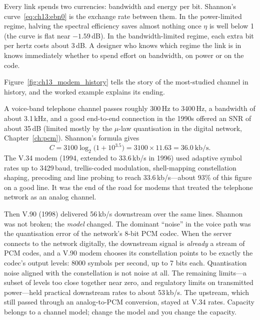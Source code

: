 \begin{keyidea}
Every link spends two currencies: bandwidth and energy per bit. Shannon's
curve~\eqref{eq:ch13:ebn0} is the exchange rate between them. In the power-limited regime, halving
the spectral efficiency saves almost nothing once $\eta$ is well below 1 (the curve is flat near
$-1.59$\,dB). In the bandwidth-limited regime, each extra bit per hertz costs about 3\,dB. A
designer who knows which regime the link is in knows immediately whether to spend effort on
bandwidth, on power or on the code.
\end{keyidea}


Figure~\ref{fig:ch13_modem_history} tells the story of the most-studied channel in history, and
the worked example explains its ending.

\begin{worked}
A voice-band telephone channel passes roughly 300\,Hz to 3400\,Hz, a bandwidth of about
3.1\,kHz, and a good end-to-end connection in the 1990s offered an SNR of about 35\,dB (limited
mostly by the $\mu$-law quantisation in the digital network, Chapter~\ref{ch:pcm}). Shannon's
formula gives
\[
C=3100\log_2\big(1+10^{3.5}\big)=3100\times11.63=36.0\ \text{kb/s}.
\]
The V.34 modem (1994, extended to 33.6\,kb/s in 1996) used adaptive symbol rates up to 3429\,baud,
trellis-coded modulation, shell-mapping constellation shaping, precoding and line probing to
reach 33.6\,kb/s---about 93\% of this figure on a good line. It was the end of the road for modems
that treated the telephone network as an analog channel.

Then V.90 (1998) delivered 56\,kb/s downstream over the same lines. Shannon was not broken; the
\emph{model} changed. The dominant ``noise'' in the voice path was the quantisation error of the
network's 8-bit PCM codec. When the server connects to the network digitally, the downstream signal
is \emph{already} a stream of PCM codes, and a V.90 modem chooses its constellation points to be
exactly the codec's output levels: 8000 symbols per second, up to 7 bits each. Quantisation noise
aligned with the constellation is not noise at all. The remaining limits---a subset of levels too
close together near zero, and regulatory limits on transmitted power---held practical downstream
rates to about 53\,kb/s. The upstream, which still passed through an analog-to-PCM conversion,
stayed at V.34 rates. Capacity belongs to a channel model; change the model and you change the
capacity.
\end{worked}


